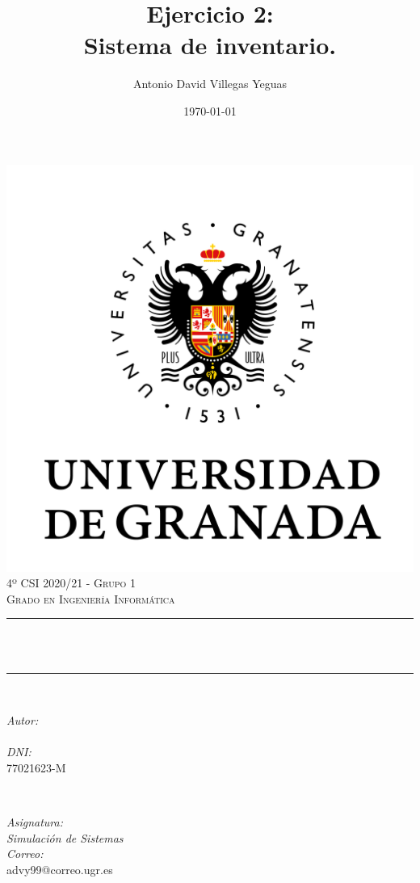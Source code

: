 \documentclass[12pt, spanish]{article}
\title{Ejercicio 2:\\
Sistema de inventario.\hspace{0.05cm} }
\author{Antonio David Villegas Yeguas}
\date{\today}
\makeatletter
\let\thetitle\@title
\let\theauthor\@author
\makeatother
\begin{document}

\begin{titlepage}
    \centering
    \vspace*{0.3 cm}
    \includegraphics[scale = 0.50]{ugr.png}\\[0.7 cm]
    \textsc{\large 4º CSI 2020/21 - Grupo 1}\\[0.5 cm]
    \textsc{\large Grado en Ingeniería Informática}\\[0.5 cm]
    \rule{\linewidth}{0.2 mm} \\[0.2 cm]
    { \huge \bfseries \thetitle}\\
    \rule{\linewidth}{0.2 mm} \\[1 cm]

    \begin{minipage}{0.4\textwidth}
        \begin{flushleft} \large
            \emph{Autor:}\\
            \theauthor\\
			 \emph{DNI:}\\
            77021623-M
            \end{flushleft}
            \end{minipage}~
            \begin{minipage}{0.4\textwidth}
            \begin{flushright} \large
            \emph{Asignatura: \\
            Simulación de Sistemas}   \\
            \emph{Correo:}\\
            advy99@correo.ugr.es
        \end{flushright}
    \end{minipage}\\[0.5cm]


\end{titlepage}
\end{document}
